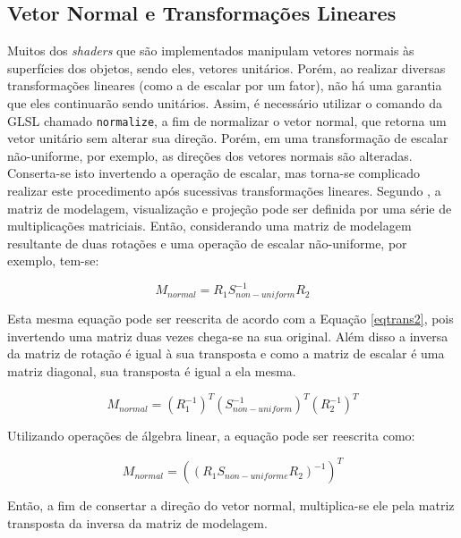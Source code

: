 	\subsection{Vetor Normal e Transformações Lineares}

	Muitos dos \textit{shaders} que são implementados manipulam vetores normais às superfícies dos objetos, sendo eles, vetores unitários. Porém, ao realizar diversas transformações lineares (como a de escalar por um fator), não há uma garantia que eles continuarão sendo unitários. Assim, é necessário utilizar o comando da GLSL chamado \texttt{normalize}, a fim de normalizar o vetor normal, que retorna um vetor unitário sem alterar sua direção. Porém, em uma transformação de escalar não-uniforme, por exemplo, as direções dos vetores normais são alteradas. Conserta-se isto invertendo a operação de escalar, mas torna-se complicado realizar este procedimento após sucessivas transformações lineares. Segundo  \cite{guha2011}, a matriz de modelagem, visualização e projeção pode ser definida por uma série de multiplicações matriciais. Então, considerando uma matriz de modelagem resultante de duas rotações e uma operação de escalar não-uniforme, por exemplo, tem-se:


	\begin{equation}
		M_ {normal} = R_ {1} S_ {non-uniform}^{-1} R_ {2}
	\label{eqtrans1}
	\end{equation}

	Esta mesma equação pode ser reescrita de acordo com a Equação \ref{eqtrans2}, pois invertendo uma matriz duas vezes chega-se na sua original. Além disso a inversa da matriz de rotação é igual à sua transposta e como a matriz de escalar é uma matriz diagonal, sua transposta é igual a ela mesma.

	\begin{equation}
		M_ {normal} = (R_ {1}^{-1})^{T} (S_ {non-uniform}^{-1})^{ T} (R_ {2}^{-1})^{T}
	\label{eqtrans2}
	\end{equation}

	Utilizando operações de álgebra linear, a equação pode ser reescrita como:

	\begin{equation}
		M_ {normal} = ((R_ {1} S_ {non-uniforme} R_ {2})^{-1})^{T}
	\label{eqtrans3}
	\end{equation}
	
	Então, a fim de consertar a direção do vetor normal, multiplica-se ele pela matriz transposta da inversa da matriz de modelagem.  

